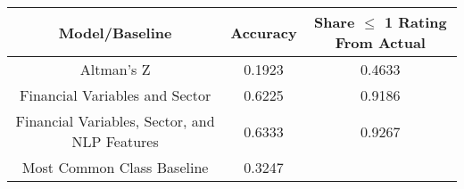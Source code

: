 \footnotesize
\begin{tabular}{ccc}
\toprule
Model/Baseline & Accuracy & Share $\le$ 1 Rating From Actual \\
\midrule
Altman's Z & 0.1923 & 0.4633 \\
Financial Variables and Sector & 0.6225 & 0.9186 \\
Financial Variables, Sector, and NLP Features & 0.6333 & 0.9267 \\
Most Common Class Baseline & 0.3247 &  \\
\bottomrule
\end{tabular}

\normalsize